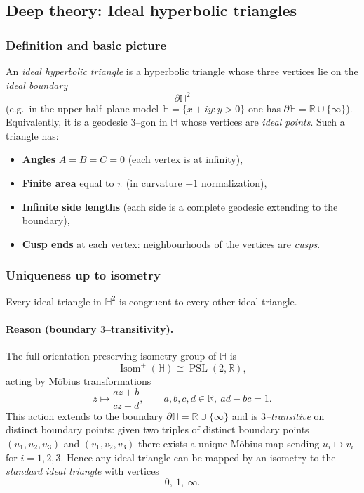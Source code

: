 \documentclass[12pt,a4paper]{article}
\newcommand{\R}{\mathbb{R}}
\DeclareMathOperator{\PSL}{PSL}
\DeclareMathOperator{\Isom}{Isom}
\newcommand{\HH}{\mathbb{H}}
\theoremstyle{plain}
\theoremstyle{definition}      %
\begin{document}
	\clearpage
	
	
	\subsection*{Deep theory: Ideal hyperbolic triangles}
	
	\subsubsection*{Definition and basic picture}
	An \emph{ideal hyperbolic triangle} is a hyperbolic triangle whose three vertices lie on the \emph{ideal boundary}
	\[
	\partial \HH^2
	\]
	(e.g.\ in the upper half–plane model $\HH=\{x+iy:y>0\}$ one has $\partial\HH=\R\cup\{\infty\}$).
	Equivalently, it is a geodesic $3$--gon in $\HH$ whose vertices are \emph{ideal points}.
	Such a triangle has:
	\begin{itemize}
		\item \textbf{Angles} $A=B=C=0$ (each vertex is at infinity),
		\item \textbf{Finite area} equal to $\pi$ (in curvature $-1$ normalization),
		\item \textbf{Infinite side lengths} (each side is a complete geodesic extending to the boundary),
		\item \textbf{Cusp ends} at each vertex: neighbourhoods of the vertices are \emph{cusps}.
	\end{itemize}
	
	\subsubsection*{Uniqueness up to isometry}
	Every ideal triangle in $\HH^2$ is congruent to every other ideal triangle.
	
	\paragraph{Reason (boundary $3$--transitivity).}
	The full orientation-preserving isometry group of $\HH$ is
	\[
	\Isom^+(\HH)\cong \PSL(2,\R),
	\]
	acting by Möbius transformations
	\[
	z\longmapsto \frac{az+b}{cz+d},\qquad a,b,c,d\in\R,\ ad-bc=1.
	\]
	This action extends to the boundary $\partial\HH=\R\cup\{\infty\}$ and is \emph{$3$--transitive} on distinct boundary points:
	given two triples of distinct boundary points $(u_1,u_2,u_3)$ and $(v_1,v_2,v_3)$ there exists a unique Möbius map
	sending $u_i\mapsto v_i$ for $i=1,2,3$.
	Hence any ideal triangle can be mapped by an isometry to the \emph{standard ideal triangle} with vertices
	\[
	0,\ 1,\ \infty.
	\]
	
\end{document}
